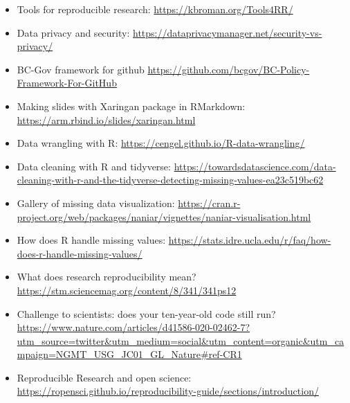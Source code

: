 \documentclass[
  12pt,
]{book}
\begin{document}
\begin{itemize}
\item
  Tools for reproducible research: \url{https://kbroman.org/Tools4RR/}
\item
  Data privacy and security: \url{https://dataprivacymanager.net/security-vs-privacy/}
\item
  BC-Gov framework for github \url{https://github.com/bcgov/BC-Policy-Framework-For-GitHub}
\item
  Making slides with Xaringan package in RMarkdown: \url{https://arm.rbind.io/slides/xaringan.html}
\item
  Data wrangling with R: \url{https://cengel.github.io/R-data-wrangling/}
\item
  Data cleaning with R and tidyverse: \url{https://towardsdatascience.com/data-cleaning-with-r-and-the-tidyverse-detecting-missing-values-ea23c519bc62}
\item
  Gallery of missing data visualization: \url{https://cran.r-project.org/web/packages/naniar/vignettes/naniar-visualisation.html}
\item
  How does R handle missing values: \url{https://stats.idre.ucla.edu/r/faq/how-does-r-handle-missing-values/}
\item
  What does research reproducibility mean? \url{https://stm.sciencemag.org/content/8/341/341ps12}
\item
  Challenge to scientists: does your ten-year-old code still run? \url{https://www.nature.com/articles/d41586-020-02462-7?utm_source=twitter\&utm_medium=social\&utm_content=organic\&utm_campaign=NGMT_USG_JC01_GL_Nature\#ref-CR1}
\item
  Reproducible Research and open science: \url{https://ropensci.github.io/reproducibility-guide/sections/introduction/}
\end{itemize}
\end{document}
